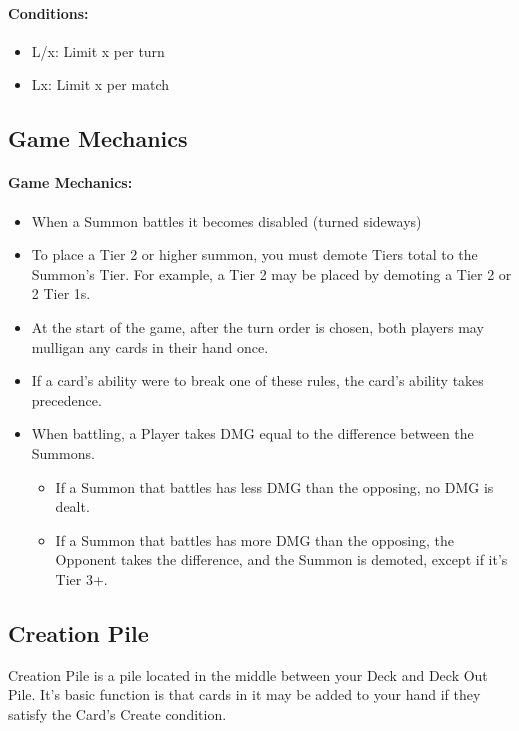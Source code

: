 \documentclass[12pt, letterpaper]{article}
\begin{document}
\paragraph{Conditions:}
\begin{itemize}
    \item L/x: Limit x per turn
    \item Lx: Limit x per match
\end{itemize}
\newpage
\subsection{Game Mechanics}
\paragraph{Game Mechanics: \\}
\begin{itemize}
    \item When a Summon battles it becomes disabled (turned sideways)
    \item To place a Tier 2 or higher summon, you must demote Tiers total to the Summon's Tier. 
    For example, a Tier 2 may be placed by demoting a Tier 2 or 2 Tier 1s.
    \item At the start of the game, after the turn order is chosen, both players may mulligan any cards in their hand once.
    \item If a card’s ability were to break one of these rules, the card's ability takes precedence.
    \item When battling, a Player takes DMG equal to the difference between the Summons. 
    \begin{itemize}
        \item If a Summon that battles has less DMG than the opposing, no DMG is dealt.
        \item If a Summon that battles has more DMG than the opposing, the Opponent takes the difference, 
        and the Summon is demoted, except if it's Tier 3+. 
    \end{itemize} 
\end{itemize}

\newpage
\subsection{Creation Pile}
Creation Pile is a pile located in the middle between your Deck and Deck Out Pile. It's basic function is that 
cards in it may be added to your hand if they satisfy the Card's Create condition. 
\end{document}
